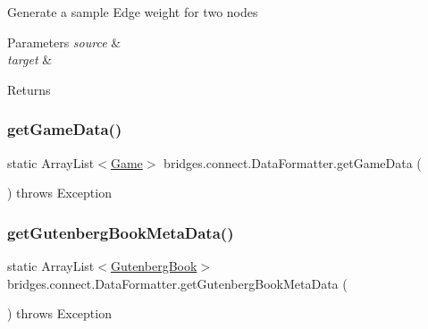 Generate a sample Edge weight for two nodes 
\begin{DoxyParams}{Parameters}
{\em source} & \\
\hline
{\em target} & \\
\hline
\end{DoxyParams}
\begin{DoxyReturn}{Returns}

\end{DoxyReturn}
\hypertarget{classbridges_1_1connect_1_1_data_formatter_a4098317468be22b4284156d6cd2212e1}{}\label{classbridges_1_1connect_1_1_data_formatter_a4098317468be22b4284156d6cd2212e1} 
\subsubsection{\texorpdfstring{get\+Game\+Data()}{getGameData()}}
{\footnotesize\ttfamily static Array\+List$<$\hyperlink{classbridges_1_1data__src__dependent_1_1_game}{Game}$>$ bridges.\+connect.\+Data\+Formatter.\+get\+Game\+Data (\begin{DoxyParamCaption}{ }\end{DoxyParamCaption}) throws Exception\hspace{0.3cm}{\ttfamily [static]}}

\hypertarget{classbridges_1_1connect_1_1_data_formatter_a4bd21bd830238db40b511474afc77b61}{}\label{classbridges_1_1connect_1_1_data_formatter_a4bd21bd830238db40b511474afc77b61} 
\subsubsection{\texorpdfstring{get\+Gutenberg\+Book\+Meta\+Data()}{getGutenbergBookMetaData()}}
{\footnotesize\ttfamily static Array\+List$<$\hyperlink{classbridges_1_1data__src__dependent_1_1_gutenberg_book}{Gutenberg\+Book}$>$ bridges.\+connect.\+Data\+Formatter.\+get\+Gutenberg\+Book\+Meta\+Data (\begin{DoxyParamCaption}{ }\end{DoxyParamCaption}) throws Exception\hspace{0.3cm}{\ttfamily [static]}}

